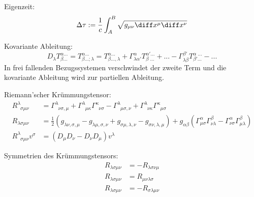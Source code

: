 \documentclass[11pt]{article}
\numberwithin{equation}{section}
\begin{document}
          Eigenzeit:
          \begin{equation}
            \Delta\tau := \frac{1}{c}\int_A^B\sqrt{g_{\mu\nu}\diff x^\mu \diff x^\nu}
          \end{equation}

          Kovariante Ableitung:
          \begin{equation}
            D_\lambda T^{\alpha ...}_{\beta...} =
            T^{\alpha ...}_{\beta...;\lambda} = T^{\alpha...}_{\beta ...,\lambda}
            + \Gamma^\alpha_{\lambda\alpha'} T^{\alpha'...}_{\beta\phantom{\prime}...} + ...
            -\Gamma^{\beta'}_{\lambda\beta} T^{\alpha\phantom{\prime}...}_{\beta'...} - ...
          \end{equation}
          In frei fallenden Bezugssystemen verschwindet der zweite Term und die kovariante Ableitung wird zur partiellen Ableitung.

          Riemann'scher Krümmungstensor:
          \begin{equation}
            \begin{aligned}
              R^{\lambda}_{\phantom{\lambda}\sigma\mu\nu} &= \Gamma^{\lambda}_{\phantom{\lambda}\nu\sigma,\mu}
              + \Gamma^{\lambda}_{\phantom{\lambda}\mu\kappa}\Gamma^{\kappa}_{\phantom{\kappa}\nu\sigma}
              -
              \Gamma^{\lambda}_{\phantom{\lambda}\mu\sigma,\nu}
              + \Gamma^{\lambda}_{\phantom{\lambda}\nu\kappa}\Gamma^{\kappa}_{\phantom{\kappa}\mu\sigma} \\
              R_{\lambda\sigma\mu\nu} &= \frac{1}{2}\left(
                g_{\lambda\nu,\sigma,\mu} - g_{\lambda\mu,\sigma,\nu} + g_{\sigma\mu,\lambda,\nu} - g_{\sigma\nu,\lambda,\mu}
              \right)
              + g_{\alpha\beta} \left(
                \Gamma^{\alpha}_{\mu\sigma} \Gamma^{\beta}_{\nu\lambda} - \Gamma^{\alpha}_{\nu\sigma} \Gamma^{\beta}_{\mu\lambda}
              \right)
              \\
              R^{\lambda}_{\phantom{\lambda}\sigma\mu\nu}v^\sigma &= \left(D_\mu D_\nu - D_\nu D_\mu \right) v^\lambda
            \end{aligned}
          \end{equation}

          Symmetrien des Krümmungstensors:
          \begin{equation}
            \begin{aligned}
              R_{\lambda\sigma\mu\nu} &= - R_{\lambda\sigma\nu\mu} \\
              R_{\lambda\sigma\mu\nu} &= R_{\mu\nu\lambda\sigma} \\
              R_{\lambda\sigma\mu\nu} &= -
              R_{\sigma\lambda\mu\nu} \\
            \end{aligned}
          \end{equation}
\end{document}
